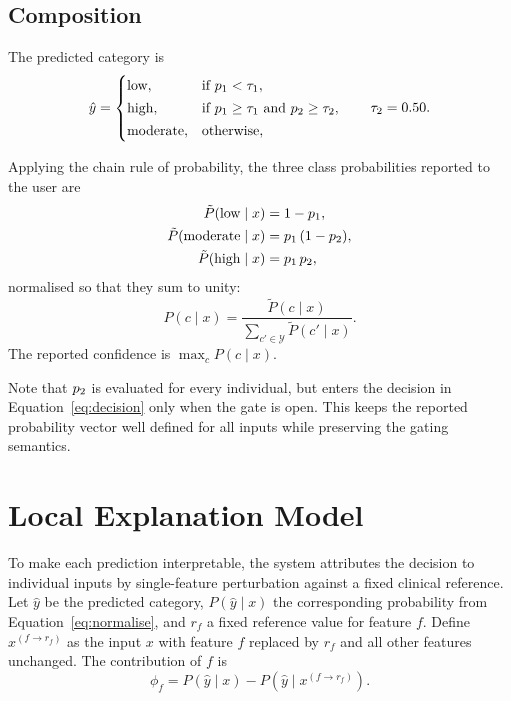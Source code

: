 \subsection{Composition}

The predicted category is
\begin{equation}
\hat{y} =
\begin{cases}
\text{low}, & \text{if } p_{1} < \tau_{1},\\[2pt]
\text{high}, & \text{if } p_{1} \geq \tau_{1} \ \text{and}\ p_{2} \geq \tau_{2},\\[2pt]
\text{moderate}, & \text{otherwise},
\end{cases}
\qquad \tau_{2} = 0.50 .
\label{eq:decision}
\end{equation}

Applying the chain rule of probability, the three class probabilities reported to
the user are
\begin{align}
\tilde{P}(\text{low} \mid x)      &= 1 - p_{1}, \label{eq:plow}\\
\tilde{P}(\text{moderate} \mid x) &= p_{1}\,(1 - p_{2}), \label{eq:pmod}\\
\tilde{P}(\text{high} \mid x)     &= p_{1}\,p_{2}, \label{eq:phigh}
\end{align}
normalised so that they sum to unity:
\begin{equation}
P(c \mid x) = \frac{\tilde{P}(c \mid x)}{\sum_{c' \in \mathcal{Y}} \tilde{P}(c' \mid x)} .
\label{eq:normalise}
\end{equation}
The reported confidence is $\max_{c} P(c \mid x)$.

Note that $p_{2}$ is evaluated for every individual, but enters the decision in
Equation~\ref{eq:decision} only when the gate is open. This keeps the reported
probability vector well defined for all inputs while preserving the gating
semantics.

\section{Local Explanation Model}
\label{sec:explanation_model}

To make each prediction interpretable, the system attributes the decision to
individual inputs by single-feature perturbation against a fixed clinical
reference. Let $\hat{y}$ be the predicted category, $P(\hat{y} \mid x)$ the
corresponding probability from Equation~\ref{eq:normalise}, and $r_f$ a fixed
reference value for feature $f$. Define $x^{(f \rightarrow r_f)}$ as the input
$x$ with feature $f$ replaced by $r_f$ and all other features unchanged. The
contribution of $f$ is
\begin{equation}
\phi_f = P(\hat{y} \mid x) - P\!\left(\hat{y} \mid x^{(f \rightarrow r_f)}\right).
\label{eq:phi}
\end{equation}

